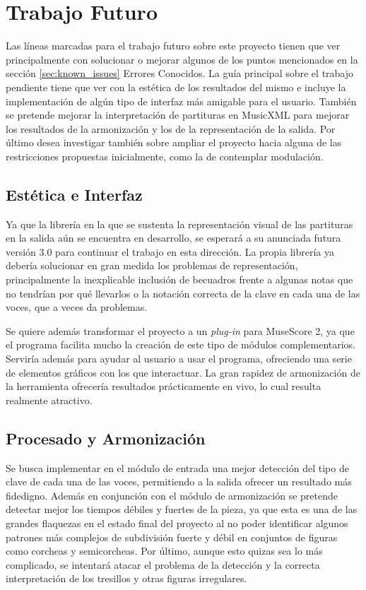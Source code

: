 \section{Trabajo Futuro}
\label{sec:future_work}
Las líneas marcadas para el trabajo futuro sobre este proyecto tienen que ver principalmente con solucionar o mejorar algunos de los puntos mencionados en la sección \ref{sec:known_issues} Errores Conocidos. La guía principal sobre el trabajo pendiente tiene que ver con la estética de los resultados del mismo e incluye la implementación de algún tipo de interfaz más amigable para el usuario. También se pretende mejorar la interpretación de partituras en MusicXML para mejorar los resultados de la armonización y los de la representación de la salida. Por último desea investigar también sobre ampliar el proyecto hacia alguna de las restricciones propuestas inicialmente, como la de contemplar modulación.

\subsection{Estética e Interfaz}
\label{subsec:look_interface}
Ya que la librería en la que se sustenta la representación visual de las partituras en la salida aún se encuentra en desarrollo, se esperará a su anunciada futura versión 3.0 para continuar el trabajo en esta dirección. La propia librería ya debería solucionar en gran medida los problemas de representación, principalmente la inexplicable inclusión de becuadros frente a algunas notas que no tendrían por qué llevarlos o la notación correcta de la clave en cada una de las voces, que a veces da problemas. 

Se quiere además transformar el proyecto a un \textit{plug-in} para MuseScore 2, ya que el programa facilita mucho la creación de este tipo de módulos complementarios. Serviría además para ayudar al usuario a usar el programa, ofreciendo una serie de elementos gráficos con los que interactuar. La gran rapidez de armonización de la herramienta ofrecería resultados prácticamente en vivo, lo cual resulta realmente atractivo. 

\subsection{Procesado y Armonización}
\label{subsec:parsing_harm}
Se busca implementar en el módulo de entrada una mejor detección del tipo de clave de cada una de las voces, permitiendo a la salida ofrecer un resultado más fidedigno. Además en conjunción con el módulo de armonización se pretende detectar mejor los tiempos débiles y fuertes de la pieza, ya que esta es una de las grandes flaquezas en el estado final del proyecto al no poder identificar algunos patrones más complejos de subdivisión fuerte y débil en conjuntos de figuras como corcheas y semicorcheas. Por último, aunque esto quizas sea lo más complicado, se intentará atacar el problema de la detección y la correcta interpretación de los tresillos y otras figuras irregulares.

